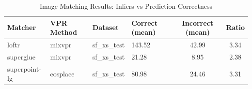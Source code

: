 \begin{table}[h]
\centering
\caption{Image Matching Results: Inliers vs Prediction Correctness}
\label{tab:image_matching}
\begin{tabular}{llllcc}
\hline
Matcher & VPR Method & Dataset & Correct (mean) & Incorrect (mean) & Ratio \\
\hline
loftr & mixvpr & sf_xs_test & 143.52 & 42.99 & 3.34 \\
superglue & mixvpr & sf_xs_test & 21.28 & 8.95 & 2.38 \\
superpoint-lg & cosplace & sf_xs_test & 80.98 & 24.46 & 3.31 \\
\hline
\end{tabular}
\end{table}